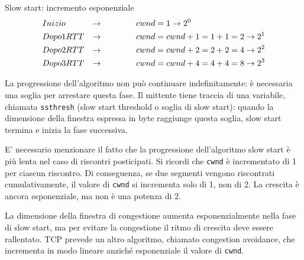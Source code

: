 \begin{Algoritmo}{Slow start: incremento esponenziale}{}
    \begin{align*}
        &Inizio&\rightarrow &\hspace{1.5cm}cwnd=1\rightarrow 2^0\\
        &Dopo 1 RTT&\rightarrow &\hspace{1.5cm}cwnd=cwnd+1=1+1=2\rightarrow 2^1\\
        &Dopo 2 RTT&\rightarrow &\hspace{1.5cm}cwnd=cwnd+2=2+2=4\rightarrow 2^2\\
        &Dopo 3 RTT&\rightarrow &\hspace{1.5cm}cwnd=cwnd+4=4+4=8\rightarrow 2^3
    \end{align*}

    La progressione dell'algoritmo non può continuare indefinitamente: è necessaria una soglia per arrestare questa fase. Il mittente tiene traccia di una variabile, chiamata \verb|ssthresh| (slow start threshold o soglia di slow start): quando la dimensione della finestra espressa in byte raggiunge questa soglia, slow start termina e inizia la fase successiva.
\end{Algoritmo}

E' necessario menzionare il fatto che la progressione dell'algoritmo slow start è più lenta nel caso di riscontri posticipati. Si ricordi che \verb|cwnd| è incrementato di 1 per ciascun riscontro. Di conseguenza, se due segmenti vengono riscontrati cumulativamente, il valore di \verb|cwnd| si incrementa solo di 1, non di 2. La crescita è ancora esponenziale, ma non è una potenza di 2.

La dimensione della finestra di congestione aumenta esponenzialmente nella fase di slow start, ma per evitare la congestione il ritmo di crescita deve essere rallentato. TCP prevede un altro algoritmo, chiamato congestion avoidance, che incrementa in modo lineare anziché esponenziale il valore di \verb|cwnd|.

